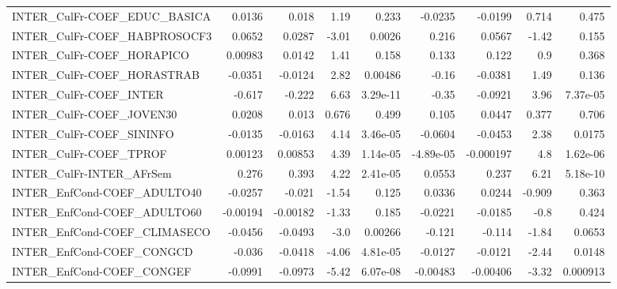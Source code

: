 \begin{tabular}{lrrrrrrrr}
INTER\_CulFr-COEF\_EDUC\_BASICA          &      0.0136 &        0.018 &     1.19 &    0.233 &    -0.0235 &     -0.0199 &        0.714 &         0.475 \\
INTER\_CulFr-COEF\_HABPROSOCF3          &      0.0652 &       0.0287 &    -3.01 &   0.0026 &      0.216 &      0.0567 &        -1.42 &         0.155 \\
INTER\_CulFr-COEF\_HORAPICO             &     0.00983 &       0.0142 &     1.41 &    0.158 &      0.133 &       0.122 &          0.9 &         0.368 \\
INTER\_CulFr-COEF\_HORASTRAB            &     -0.0351 &      -0.0124 &     2.82 &  0.00486 &      -0.16 &     -0.0381 &         1.49 &         0.136 \\
INTER\_CulFr-COEF\_INTER                &      -0.617 &       -0.222 &     6.63 & 3.29e-11 &      -0.35 &     -0.0921 &         3.96 &      7.37e-05 \\
INTER\_CulFr-COEF\_JOVEN30              &      0.0208 &        0.013 &    0.676 &    0.499 &      0.105 &      0.0447 &        0.377 &         0.706 \\
INTER\_CulFr-COEF\_SININFO              &     -0.0135 &      -0.0163 &     4.14 & 3.46e-05 &    -0.0604 &     -0.0453 &         2.38 &        0.0175 \\
INTER\_CulFr-COEF\_TPROF                &     0.00123 &      0.00853 &     4.39 & 1.14e-05 &  -4.89e-05 &   -0.000197 &          4.8 &      1.62e-06 \\
INTER\_CulFr-INTER\_AFrSem              &       0.276 &        0.393 &     4.22 & 2.41e-05 &     0.0553 &       0.237 &         6.21 &      5.18e-10 \\
INTER\_EnfCond-COEF\_ADULTO40           &     -0.0257 &       -0.021 &    -1.54 &    0.125 &     0.0336 &      0.0244 &       -0.909 &         0.363 \\
INTER\_EnfCond-COEF\_ADULTO60           &    -0.00194 &     -0.00182 &    -1.33 &    0.185 &    -0.0221 &     -0.0185 &         -0.8 &         0.424 \\
INTER\_EnfCond-COEF\_CLIMASECO          &     -0.0456 &      -0.0493 &     -3.0 &  0.00266 &     -0.121 &      -0.114 &        -1.84 &        0.0653 \\
INTER\_EnfCond-COEF\_CONGCD             &      -0.036 &      -0.0418 &    -4.06 & 4.81e-05 &    -0.0127 &     -0.0121 &        -2.44 &        0.0148 \\
INTER\_EnfCond-COEF\_CONGEF             &     -0.0991 &      -0.0973 &    -5.42 & 6.07e-08 &   -0.00483 &    -0.00406 &        -3.32 &      0.000913 \\

\end{tabular}
